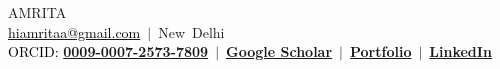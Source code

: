 \documentclass[10pt,letterpaper]{article}
\newcommand{\weblink}[2]{\href{#1}{\textbf{#2}}}
\newcommand{\blacklink}[2]{\href{#1}{\textcolor{black}{#2}}}
\newenvironment{spread}[2][\normalsize]{\par\begingroup\linespread{#2}#1\selectfont}{\par\endgroup}
\begin{document}
\begin{center}
  {\LARGE\MakeUppercase{Amrita}}\\[9pt]
  {\small \blacklink{mailto:hiamritaa@gmail.com}{hiamritaa@gmail.com} $\,\vert\,$ New~Delhi}\\[3pt]
  {\small \textcolor{black}{ORCID:} \weblink{https://orcid.org/0009-0007-2573-7809}{0009-0007-2573-7809} $\,\vert\,$ \weblink{https://scholar.google.com/citations?user=fHuE-LEAAAAJ\&hl=en}{Google Scholar} $\,\vert\,$ \weblink{https://behance.net/hiamritaa}{Portfolio} $\,\vert\,$ \weblink{https://linkedin.com/in/hiamritaa}{LinkedIn}}
\end{center}

\vspace{2pt}

\begin{spread}{1.07}

\end{spread}
\end{document}
